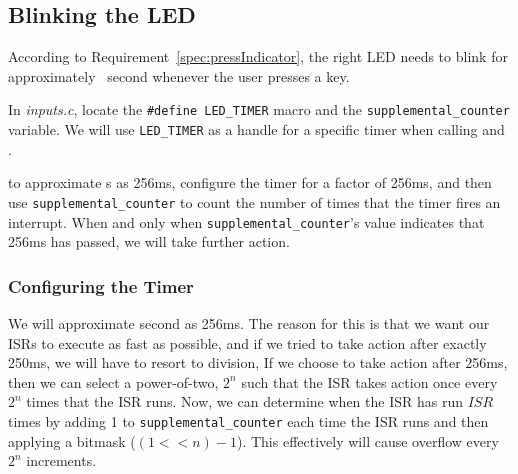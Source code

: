 \subsection{Blinking the LED} \label{subsec:blinking}

According to Requirement~\ref{spec:pressIndicator}, the right LED needs to blink for approximately \textonequarter\ second whenever the user presses a key.

In \textit{inputs.c}, locate the \lstinline{#define LED_TIMER} macro and the \lstinline{supplemental_counter} variable.
We will use \lstinline{LED_TIMER} as a handle for a specific timer when calling
 and .

to approximate \textonequarter s as 256ms, configure the timer for a factor of 256ms, and then use \lstinline{supplemental_counter} to count the number of times that the timer fires an interrupt.
When and only when \lstinline{supplemental_counter}'s value indicates that 256ms has passed, we will take further action.

\subsubsection{Configuring the Timer}

We will approximate \textonequarter second as 256ms.
The reason for this is that we want our ISRs to execute as fast as possible, and if we tried to take action after exactly 250ms, we will have to resort to division,
If we choose to take action after 256ms, then we can select a power-of-two, $2^n$ such that the ISR takes action once every $2^n$ times that the ISR runs.
Now, we can determine when the ISR has run $ISR$ times by adding 1 to \lstinline{supplemental_counter} each time the ISR runs and then applying a bitmask ($(1 << n) - 1$).
This effectively will cause overflow every $2^n$ increments.

